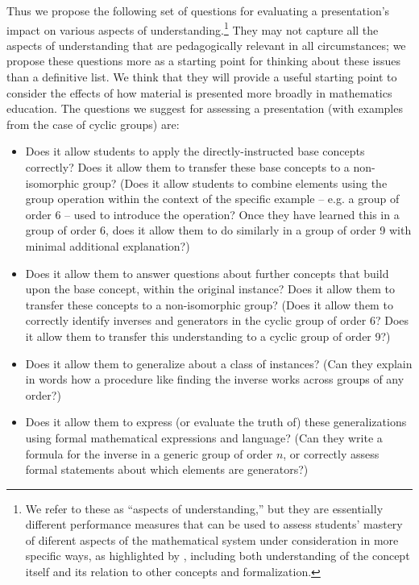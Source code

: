 \documentclass[man,10pt]{apa6}
\begin{document}
Thus we propose the following set of questions for evaluating a presentation's impact on various aspects of understanding.\footnote{We refer to these as ``aspects of understanding,'' but they are essentially different performance measures that can be used to assess students' mastery of diferent aspects of the mathematical system under consideration in more specific ways, as highlighted by , including both understanding of the concept itself and its relation to other concepts and formalization.} They may not capture all the aspects of understanding that are pedagogically relevant in all circumstances; we propose these questions more as a starting point for thinking about these issues than a definitive list. We think that they will provide a useful starting point to consider the effects of how material is presented more broadly in mathematics education. The questions we suggest for assessing a presentation (with examples from the case of cyclic groups) are:
\begin{itemize}
\item Does it allow students to apply the directly-instructed base concepts correctly? Does it allow them to transfer these base concepts to a non-isomorphic group? (Does it allow students to combine elements using the group operation within the context of the specific example -- e.g. a group of order 6 -- used to introduce the operation? Once they have learned this in a group of order 6, does it allow them to do similarly in a group of order 9 with minimal additional explanation?) 
\item Does it allow them to answer questions about further concepts that build upon the base concept, within the original instance? Does it allow them to transfer these concepts to a non-isomorphic group? (Does it allow them to correctly identify inverses and generators in the cyclic group of order 6? Does it allow them to transfer this understanding to a cyclic group of order 9?)
\item Does it allow them to generalize about a class of instances? (Can they explain in words how a procedure like finding the inverse works across groups of any order?) 
\item Does it allow them to express (or evaluate the truth of) these generalizations using formal mathematical expressions and language? (Can they write a formula for the inverse in a generic group of order $n$, or correctly assess formal statements about which elements are generators?)
\end{itemize}
\end{document}
